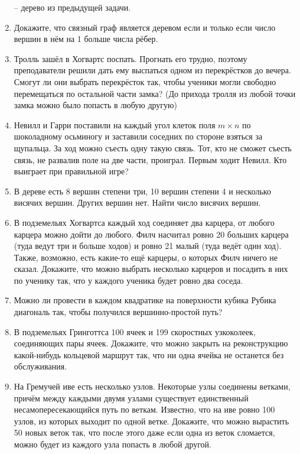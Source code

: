 \begin{enumerate}
 -- дерево из предыдущей задачи.
\item  Докажите, что связный граф является деревом если и только если число вершин в нём на 1
больше числа рёбер.
\item Тролль зашёл в Хогвартс поспать. Прогнать его трудно, поэтому преподаватели решили дать
ему выспаться одном из перекрёстков до вечера. Смогут ли они выбрать перекрёсток  так, чтобы ученики
могли свободно перемещаться по остальной части замка? (До прихода тролля из любой точки замка можно
было попасть в любую другую)
\item Невилл и Гарри поставили на каждый угол клеток поля $m \times n$ по шоколадному осьминогу и
заставили соседних по стороне взяться за щупальца. За ход можно съесть одну такую связь. Тот, кто не
сможет съесть связь, не развалив поле на две части, проиграл. Первым ходит Невилл. Кто выиграет при
правильной игре?
\item В дереве есть 8 вершин степени три, 10 вершин степени 4 и несколько висячих вершин. Других
вершин нет. Найти число висячих вершин.
\item В подземельях Хогвартса каждый ход соединяет два карцера, от любого карцера можно дойти до
любого. Филч насчитал ровно 20 больших карцера (туда ведут три и больше ходов) и ровно 21 малый
(туда ведёт один ход). Также, возможно, есть какие-то ещё карцеры, о которых Филч ничего не сказал.
Докажите, что можно выбрать несколько карцеров и посадить в них по ученику так, что у каждого
ученика будет ровно два соседа.
\item Можно ли провести в каждом квадратике на поверхности кубика Рубика диагональ так, чтобы
получился вершинно-простой путь?
\item В подземельях Гринготтса 100 ячеек и 199 скоростных узкоколеек, соединяющих пары ячеек.
Докажите, что можно закрыть на реконструкцию какой-нибудь кольцевой маршрут так, что ни одна ячейка не останется
без обслуживания.
\item На Гремучей иве есть несколько узлов. Некоторые узлы соединены ветками, причём между
каждыми двумя узлами существует единственный несамопересекающийся путь по веткам. Известно, что на
иве ровно 100 узлов, из которых выходит по одной ветке. Докажите, что можно вырастить 50 новых веток
так, что после этого даже если одна из веток сломается, можно будет из каждого узла попасть в любой
другой.

\end{enumerate}
